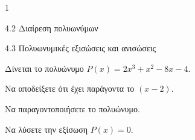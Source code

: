\begin{ylh}{1}
\item 4.2 Διαίρεση πολυωνύμων
\item 4.3 Πολυωνυμικές εξισώσεις και ανισώσεις
\end{ylh}
Δίνεται το πολυώνυμο $P(x) = 2x^3 + x^2 - 8x - 4$.
\begin{alist}
\item Να αποδείξετε ότι έχει παράγοντα το $(x - 2)$.
\item Να παραγοντοποιήσετε το πολυώνυμο.
\item Να λύσετε την εξίσωση $P(x) = 0$.
\end{alist}

